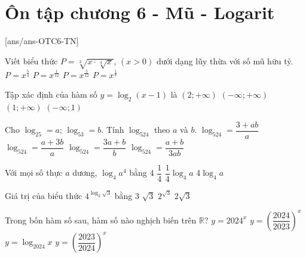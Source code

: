 \section{Ôn tập chương 6 - Mũ - Logarit}
[ans/ans-OTC6-TN]
\caulc
\begin{ex}%
	Viết biểu thức $P=\sqrt[3]{x\cdot\sqrt[4]{x}}$, $(x>0)$ dưới dạng lũy thừa với số mũ hữu tỷ. 
	\choice
	{$P=x^{\tfrac{5}{4}}$}
	{$P=x^{\tfrac{1}{12}}$}
	{\True $P=x^{\tfrac{5}{12}}$}
	{$P=x^{\tfrac{1}{7}}$}
\end{ex}
\begin{ex}%
	Tập xác định của hàm số $y=\log_2(x-1)$ là
	\choice
	{$(2;+\infty)$}
	{$(-\infty;+\infty)$}
	{\True $(1;+\infty)$}
	{$(-\infty;1)$}
\end{ex}
\begin{ex}%
	Cho $\log_25=a$; $\log_53=b$. Tính $\log_524$ theo $a$ và $b$. 
	\choice
	{\True $\log_524=\dfrac{3+ab}{a}$}
	{$\log_524=\dfrac{a+3b}{a}$}
	{$\log_524=\dfrac{3a+b}{b}$}
	{$\log_524=\dfrac{a+b}{3ab}$}
\end{ex}
\begin{ex}%
	Với mọi số thực $a$ dương, $\log_4a^4$ bằng
	\choice
	{$4$}
	{$\dfrac{1}{4}$}
	{$\dfrac{1}{4}\log_4a$}
	{\True $4\log_4a$}
\end{ex}
\begin{ex}%
	Giá trị của biểu thức $4^{\log_2\sqrt{3}}$ bằng
	\choice
	{\True $3$}
	{$\sqrt{3}$}
	{$2^{\sqrt{3}}$}
	{$2\sqrt{3}$}
\end{ex}
\begin{ex}%
	Trong bốn hàm số sau, hàm số nào nghịch biến trên $\mathbb{R}$?
	\choice
	{$y=2024^x$}
	{$y=\left(\dfrac{2024}{2023}\right)^x$}
	{$y=\log_{2024}x$}
	{\True $y=\left(\dfrac{2023}{2024}\right)^x$}
\end{ex}
